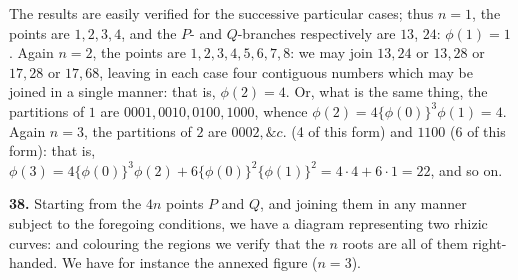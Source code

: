 \documentclass[11pt,a4paper]{article}
\begin{document}
The results are easily verified for the successive particular cases; thus $n=1$, the points are $1, 2, 3, 4$, and the $P$- and $Q$-branches respectively are $13$, $24$: $\phi(1) = 1$. Again $n=2$, the points are $1, 2, 3, 4, 5, 6, 7, 8$: we may join $13, 24$ or $13, 28$ or $17, 28$ or $17, 68$, leaving in each case four contiguous numbers which may be joined in a single manner: that is, $\phi(2) = 4$. Or, what is the same thing, the partitions of $1$ are $0001, 0010, 0100, 1000$, whence $\phi(2) = 4\{\phi(0)\}^{3}\phi(1) = 4$. Again $n = 3$, the partitions of $2$ are $0002, \&c.$ (4 of this form) and $1100$ (6 of this form): that is, $\phi(3) = 4\{\phi(0)\}^{3}\phi(2) + 6\{\phi(0)\}^{2}\{\phi(1)\}^{2} = 4\cdot 4 + 6\cdot 1 = 22$, and so on.

\medskip

\noindent\textbf{38.} Starting from the $4n$ points $P$ and $Q$, and joining them in any manner subject to the foregoing conditions, we have a diagram representing two rhizic curves: and colouring the regions we verify that the $n$ roots are all of them right-handed. We have for instance the annexed figure ($n=3$).
\end{document}
